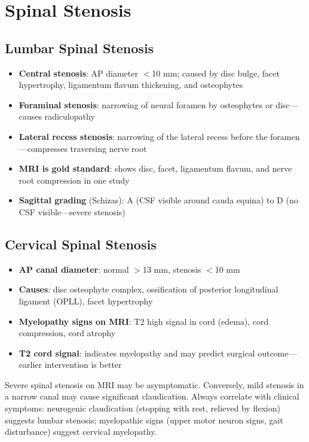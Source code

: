 \section{Spinal Stenosis}

\subsection{Lumbar Spinal Stenosis}
\begin{itemize}
  \item \textbf{Central stenosis}: AP diameter $<$10 mm; caused by disc bulge, facet hypertrophy, ligamentum flavum thickening, and osteophytes
  \item \textbf{Foraminal stenosis}: narrowing of neural foramen by osteophytes or disc---causes radiculopathy
  \item \textbf{Lateral recess stenosis}: narrowing of the lateral recess before the foramen---compresses traversing nerve root
  \item \textbf{MRI is gold standard}: shows disc, facet, ligamentum flavum, and nerve root compression in one study
  \item \textbf{Sagittal grading} (Schizas): A (CSF visible around cauda equina) to D (no CSF visible---severe stenosis)
\end{itemize}

\subsection{Cervical Spinal Stenosis}
\begin{itemize}
  \item \textbf{AP canal diameter}: normal $>$13 mm, stenosis $<$10 mm
  \item \textbf{Causes}: disc osteophyte complex, ossification of posterior longitudinal ligament (OPLL), facet hypertrophy
  \item \textbf{Myelopathy signs on MRI}: T2 high signal in cord (edema), cord compression, cord atrophy
  \item \textbf{T2 cord signal}: indicates myelopathy and may predict surgical outcome---earlier intervention is better
\end{itemize}

\begin{pearlbox}
Severe spinal stenosis on MRI may be asymptomatic. Conversely, mild stenosis in a narrow canal may cause significant claudication. Always correlate with clinical symptoms: neurogenic claudication (stopping with rest, relieved by flexion) suggests lumbar stenosis; myelopathic signs (upper motor neuron signs, gait disturbance) suggest cervical myelopathy.
\end{pearlbox}

